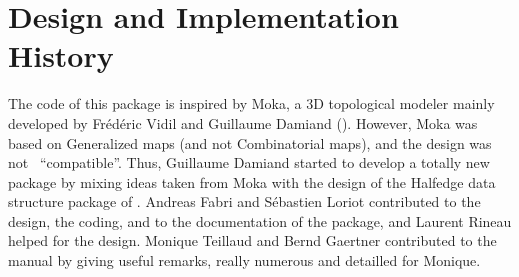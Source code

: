 \section{Design and Implementation History}
%
The code of this package is inspired by Moka, a 3D topological modeler
mainly developed by Fr\'ed\'eric Vidil and Guillaume Damiand
().
However, Moka was based on Generalized maps (and not Combinatorial
maps), and the design was not \cgal\ ``compatible''. Thus, Guillaume
Damiand started to develop a totally new package by mixing ideas taken
from Moka with the design of the Halfedge data structure package of
\cgal.  Andreas Fabri and S\'ebastien Loriot contributed to the
design, the coding, and to the documentation of the package, and
Laurent Rineau helped for the design. Monique Teillaud and Bernd
Gaertner contributed to the manual by giving useful remarks, really
numerous and detailled for Monique.
